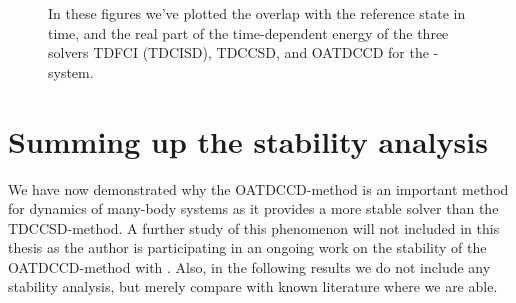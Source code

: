 \begin{figure}
            \caption{In these figures we've plotted the overlap with the
            reference state in time, and the real part of the time-dependent
            energy of the three solvers TDFCI (TDCISD), TDCCSD, and OATDCCD for
            the -system.}
            \label{fig:be-stability}
        \end{figure}



    \section{Summing up the stability analysis}
        We have now demonstrated why the OATDCCD-method is an important method
        for dynamics of many-body systems as it provides a more stable solver
        than the TDCCSD-method.
        A further study of this phenomenon will not included in this thesis as
        the author is participating in an ongoing work on the stability of the
        OATDCCD-method with \citeauthor{oa-stability} \cite{oa-stability}.
        Also, in the following results we do not include any stability analysis,
        but merely compare with known literature where we are able.
